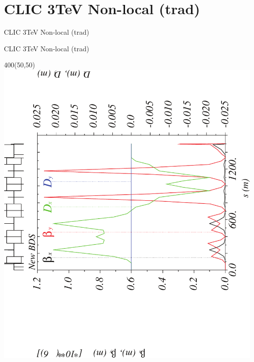 \documentclass{beamer}
\begin{document}
\section{CLIC 3TeV Non-local (trad)}
\begin{frame}
 \color{blue}\Large CLIC 3TeV Non-local (trad)
\end{frame}
\begin{frame}{CLIC 3TeV Non-local (trad)}
  \setlength{\TPHorizModule}{1pt}
  \setlength{\TPVertModule}{1pt}
 \begin{textblock}{400}(50,50)
 \includegraphics[scale=0.4,angle=-90]{CLICtrad_etax-crop.pdf}
 \end{textblock}
\end{frame}
\end{document}
